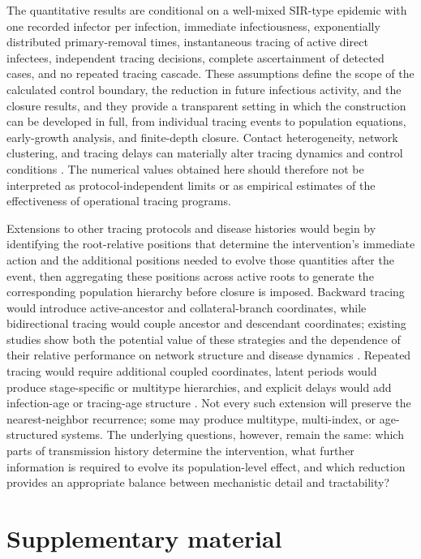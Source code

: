 \documentclass[review,12pt]{elsarticle}
\numberwithin{equation}{section}
\theoremstyle{remark}
\begin{document}
The quantitative results are conditional on a well-mixed SIR-type epidemic with one recorded infector per infection, immediate infectiousness, exponentially distributed primary-removal times, instantaneous tracing of active direct infectees, independent tracing decisions, complete ascertainment of detected cases, and no repeated tracing cascade. These assumptions define the scope of the calculated control boundary, the reduction in future infectious activity, and the closure results, and they provide a transparent setting in which the construction can be developed in full, from individual tracing events to population equations, early-growth analysis, and finite-depth closure. Contact heterogeneity, network clustering, and tracing delays can materially alter tracing dynamics and control conditions \cite{house2010,muller2016,kretzschmar2020}. The numerical values obtained here should therefore not be interpreted as protocol-independent limits or as empirical estimates of the effectiveness of operational tracing programs.

Extensions to other tracing protocols and disease histories would begin by identifying the root-relative positions that determine the intervention's immediate action and the additional positions needed to evolve those quantities after the event, then aggregating these positions across active roots to generate the corresponding population hierarchy before closure is imposed. Backward tracing would introduce active-ancestor and collateral-branch coordinates, while bidirectional tracing would couple ancestor and descendant coordinates; existing studies show both the potential value of these strategies and the dependence of their relative performance on network structure and disease dynamics \cite{bradshaw2021,kojaku2021,juul2023}. Repeated tracing would require additional coupled coordinates, latent periods would produce stage-specific or multitype hierarchies, and explicit delays would add infection-age or tracing-age structure \cite{muller2016,kretzschmar2020}. Not every such extension will preserve the nearest-neighbor recurrence; some may produce multitype, multi-index, or age-structured systems. The underlying questions, however, remain the same: which parts of transmission history determine the intervention, what further information is required to evolve its population-level effect, and which reduction provides an appropriate balance between mechanistic detail and tractability?

\section*{Supplementary material}
\end{document}
